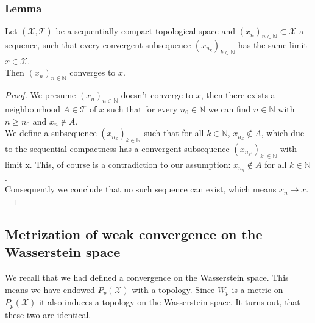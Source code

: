 \documentclass[11pt,a4paper]{article}
\begin{document}
\subsubsection{Lemma}
Let $(\mathcal{X},\mathcal{T})$ be a sequentially compact topological space and $(x_n)_{n\in\mathbb{N}}\subset{}\mathcal{X}$ a sequence, such that every convergent subsequence $(x_{n_k})_{k\in\mathbb{N}}$ has the same limit $x\in\mathcal{X}$.\\Then $(x_n)_{n\in\mathbb{N}}$ converges to $x$.
\begin{proof}
We presume $(x_n)_{n\in\mathbb{N}}$ doesn't converge to $x$, then there exists a neighbourhood $A\in\mathcal{T}$ of $x$ such that for every $n_0\in\mathbb{N}$ we can find $n\in\mathbb{N}$ with $n\geq{}n_0$ and $x_n\not\in{}A$.\vspace{1em}\\ We define a subsequence $(x_{n_k})_{k\in\mathbb{N}}$ such that for all $k\in\mathbb{N}$, $x_{n_k}\not\in{}A$, which due to the sequential compactness has a convergent subsequence $(x_{n_{k'}})_{k'\in\mathbb{N}}$ with limit x.
This, of course is a contradiction to our assumption: $x_{n_k}\not\in{}A$ for all $k\in\mathbb{N}$.\vspace{1em}\\
Consequently we conclude that no such sequence can exist, which means $x_n\rightarrow x.$
\end{proof}
\subsection{Metrization of weak convergence on the Wasserstein space}
We recall that we had defined a convergence on the Wasserstein space. This means we have endowed $P_p(\mathcal{X})$ with a topology. Since $W_p$ is a metric on $P_p(\mathcal{X})$ it also induces a topology on the Wasserstein space. It turns out, that these two are identical.
\end{document}
